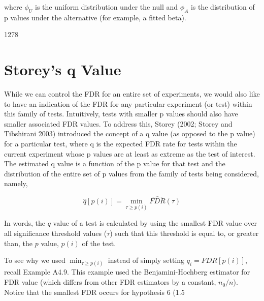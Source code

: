 \documentclass{article}
\begin{document}
where  $ \phi_{U} $ is the uniform distribution under the null and  $ \phi_{A} $ is the distribution of p values under the alternative (for example, a fitted beta).

1278

\section{Storey's q Value}
While we can control the FDR for an entire set of experiments, we would also like to have an indication of the FDR for any particular experiment (or test) within this family of tests. Intuitively, tests with smaller p values should also have smaller associated FDR values. To address this, Storey (2002; Storey and Tibshirani 2003) introduced the concept of a q value (as opposed to the p value) for a particular test, where q is the expected FDR rate for tests within the current experiment whose p values are at least as extreme as the test of interest. The estimated q value is a function of the p value for that test and the distribution of the entire set of p values from the family of tests being considered, namely,

\begin{equation}
\widehat{q}\left[p(i)\right]=\min_{\tau\geq p(i)}\widehat{F D R}(\tau)
\end{equation}

In words, the $q$ value of a test is calculated by using the smallest FDR value over all significance threshold values ($\tau$) such that this threshold is equal to, or greater than, the $p$ value, $p(i)$ of the test.

To see why we used  $ \min_{\tau \geq p(i)} $ instead of simply setting  $ q_i = FDR[p(i)] $, recall Example A4.9. This example used the Benjamini-Hochberg estimator for FDR value (which differs from other FDR estimators by a constant,  $ n_0/n $). Notice that the smallest FDR occurs for hypothesis 6 (1.5%
\end{document}
